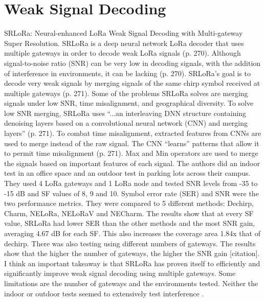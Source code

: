 \documentclass[sigsmall]{acmart}
\begin{document}
\section*{Weak Signal Decoding}
SRLoRa: Neural-enhanced LoRa Weak Signal Decoding with Multi-gateway Super Resolution. SRLoRa is a deep neural network LoRa decoder that uses multiple gateways in order to decode weak LoRa signals (p. 270). Although signal-to-noise ratio (SNR) can be very low in decoding signals, with the addition of interference in environments, it can be lacking (p. 270). SRLoRa’s goal is to decode very weak signals by merging signals of the same chirp symbol received at multiple gateways (p. 271). Some of the problems SRLoRa solves are merging signals under low SNR, time misalignment, and geographical diversity. To solve low SNR merging, SRLoRa uses “...an interleaving DNN structure containing denoising layers based on a convolutional neural network (CNN) and merging layers” (p. 271). To combat time misalignment, extracted features from CNNs are used to merge instead of the raw signal. The CNN “learns” patterns that allow it to permit time misalignment (p. 271). Max and Min operators are used to merge the signals based on important features of each signal. The authors did an indoor test in an office space and an outdoor test in parking lots across their campus. They used 4 LoRa gateways and 1 LoRa node and tested SNR levels from -35 to -15 dB and SF values of 8, 9 and 10. Symbol error rate (SER) and SNR were the two performance metrics. They were compared to 5 different methods: Dechirp, Charm, NELoRa, NELoRaV and NECharm. The results show that at every SF value, SRLoRa had lower SER than the other methods and the most SNR gain, averaging 4.67 dB for each SF. This also increases the coverage area 1.84x that of dechirp. There was also testing using different numbers of gateways. The results show that the higher the number of gateways, the higher the SNR gain [citation]. I think an important takeaway is that SRLoRa has proven itself to efficiently and significantly improve weak signal decoding using multiple gateways. Some limitations are the number of gateways and the environments tested. Neither the indoor or outdoor tests seemed to extensively test interference \cite{du2023srlora}.
\end{document}
